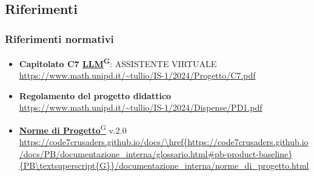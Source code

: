 \subsection{Riferimenti}
\subsubsection{Riferimenti normativi}
\begin{itemize}
    \item \textbf{Capitolato C7 \href{https://code7crusaders.github.io/docs/PB/documentazione_interna/glossario.html#llm-large-language-model}{LLM}\textsuperscript{G}}: ASSISTENTE VIRTUALE \\ \url{https://www.math.unipd.it/~tullio/IS-1/2024/Progetto/C7.pdf}
    \item \textbf{Regolamento del progetto didattico} \\ \url{https://www.math.unipd.it/~tullio/IS-1/2024/Dispense/PD1.pdf}
    \item \href{https://code7crusaders.github.io/docs/PB/documentazione_interna/glossario.html#norme-di-progetto}{\textbf{Norme di Progetto}\textsuperscript{G}} v.2.0 \\ \url{https://code7crusaders.github.io/docs/\href{https://code7crusaders.github.io/docs/PB/documentazione_interna/glossario.html#pb-product-baseline}{PB\textsuperscript{G}}/documentazione_interna/norme_di_progetto.html}
\end{itemize}

